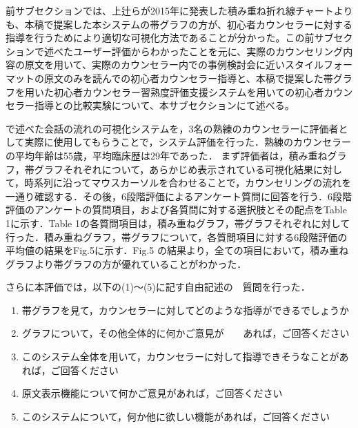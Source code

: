 \documentclass[shuuron]{kuee}
\begin{document}



前サブセクションでは、上辻らが2015年に発表した積み重ね折れ線チャートよりも、本稿で提案した本システムの帯グラフの方が、初心者カウンセラーに対する指導を行うためにより適切な可視化方法であることが分かった。この前サブセクションで述べたユーザー評価からわかったことを元に、実際のカウンセリング内容の原文を用いて、実際のカウンセラー内での事例検討会に近いスタイルフォーマットの原文のみを読んでの初心者カウンセラー指導と、本稿で提案した帯グラフを用いた初心者カウンセラー習熟度評価支援システムを用いての初心者カウンセラー指導との比較実験について、本サブセクションにて述べる。

で述べた会話の流れの可視化システムを，3名の熟練のカウンセラーに評価者として実際に使用してもらうことで，システム評価を行った．熟練のカウンセラーの平均年齢は55歳，平均臨床歴は29年であった．
まず評価者は，積み重ねグラフ，帯グラフそれぞれについて，あらかじめ表示されている可視化結果に対して，時系列に沿ってマウスカーソルを合わせることで，カウンセリングの流れを一通り確認する．その後，6段階評価によるアンケート質問に回答を行う．6段階評価のアンケートの質問項目，および各質問に対する選択肢とその配点をTable 1に示す．Table 1の各質問項目は，積み重ねグラフ，帯グラフそれぞれに対して行った．積み重ねグラフ，帯グラフについて，各質問項目に対する6段階評価の平均値の結果をFig.5に示す．Fig.5 の結果より，全ての項目において，積み重ねグラフより帯グラフの方が優れていることがわかった．


さらに本評価では，以下の(1)～(5)に記す自由記述の　質問を行った．



\begin{enumerate}
 \item 帯グラフを見て，カウンセラーに対してどのような指導ができるでしょうか
 \item グラフについて，その他全体的に何かご意見が　　あれば，ご回答ください
 \item このシステム全体を用いて，カウンセラーに対して指導できそうなことがあれば，ご回答ください
 \item 原文表示機能について何かご意見があれば，ご回答ください
 \item このシステムについて，何か他に欲しい機能があれば，ご回答ください
\end{enumerate}




\end{document}
